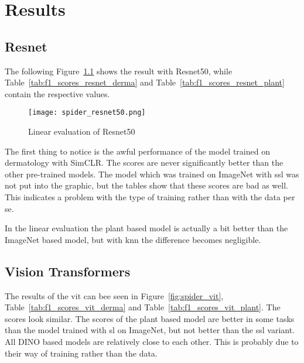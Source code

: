 \chapter{Results}

\section{Resnet}


The following Figure~\ref{fig:spider_resnet50} shows the result with Resnet50, while Table~\ref{tab:f1_scores_resnet_derma} and Table~\ref{tab:f1_scores_resnet_plant} contain the respective values.
\begin{figure}[H]
    \begin{center}
    \texttt{[image: spider\_resnet50.png]}
    \caption{Linear evaluation of Resnet50}\label{fig:spider_resnet50}
    \end{center}
\end{figure}

The first thing to notice is the awful performance of the model trained on dermatology with SimCLR. The scores are never significantly better than the other pre-trained models. The model which was trained on ImageNet with \gls{ssl} was not put into the graphic, but the tables show that these scores are bad as well. 
This indicates a problem with the type of training rather than with the data per se.

In the linear evaluation the plant based model is actually a bit better than the ImageNet based model, but with \gls{knn} the difference becomes negligible.



\section{Vision Transformers}

The results of the \gls{vit} can bee seen in Figure~\ref{fig:spider_vit}, Table~\ref{tab:f1_scores_vit_derma} and Table~\ref{tab:f1_scores_vit_plant}. 
The scores look similar. The scores of the plant based model are better in some tasks than the model trained with \gls{sl} on ImageNet, but not better than the \gls{ssl} variant. All DINO based models are relatively close to each other. This is probably due to their way of training rather than the data.

